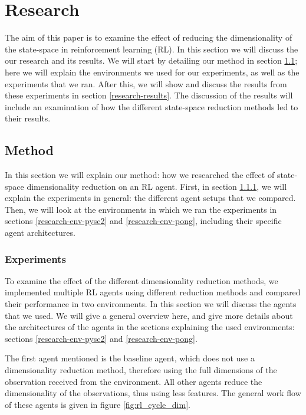 \chapter{Research}\label{research}
The aim of this paper is to examine the effect of reducing the dimensionality of the state-space in reinforcement learning (RL). In this section we will discuss the our research and its results. We will start by detailing our method in section \ref{research-method}; here we will explain the environments we used for our experiments, as well as the experiments that we ran. After this, we will show and discuss the results from these experiments in section \ref{research-results}. The discussion of the results will include an examination of how the different state-space reduction methods led to their results.

\section{Method}\label{research-method}
In this section we will explain our method: how we researched the effect of state-space dimensionality reduction on an RL agent. First, in section \ref{research-exp}, we will explain the experiments in general: the different agent setups that we compared. Then, we will look at the environments in which we ran the experiments in sections \ref{research-env-pysc2} and \ref{research-env-pong}, including their specific agent architectures.

\subsection{Experiments}\label{research-exp}
To examine the effect of the different dimensionality reduction methods, we implemented multiple RL agents using different reduction methods and compared their performance in two environments. In this section we will discuss the agents that we used. We will give a general overview here, and give more details about the architectures of the agents in the sections explaining the used environments: sections \ref{research-env-pysc2} and \ref{research-env-pong}.

The first agent mentioned is the baseline agent, which does not use a dimensionality reduction method, therefore using the full dimensions of the observation received from the environment. All other agents reduce the dimensionality of the observations, thus using less features. The general work flow of these agents is given in figure \ref{fig:rl_cycle_dim}.

